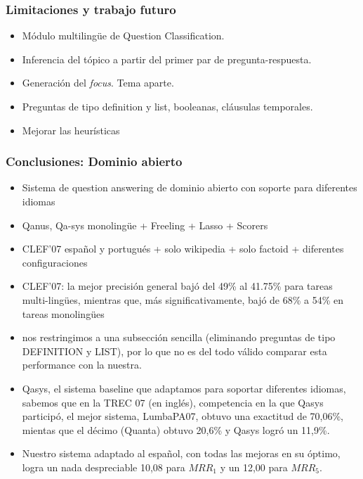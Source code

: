 \begin{frame}
\frametitle{Limitaciones y trabajo futuro}
\begin{itemize}
  \item Módulo multilingüe de Question Classification.
  \item Inferencia del tópico a partir del primer par de pregunta-respuesta.
  \item Generación del \textit{focus}. Tema aparte.
  \item Preguntas de tipo definition y list, booleanas, cláusulas temporales.
  \item Mejorar las heurísticas
\end{itemize}

\end{frame}


\begin{frame}
\frametitle{Conclusiones: Dominio abierto}
  \begin{itemize}
    \item Sistema de question answering de dominio abierto con soporte para diferentes idiomas
    \item Qanus, Qa-sys monolingüe + Freeling + Lasso + Scorers
    \item CLEF'07 español y portugués + solo wikipedia + solo factoid + diferentes configuraciones
    \item CLEF'07: la mejor precisión general bajó del 49\% al 41.75\% para tareas multi-lingües, mientras que, más significativamente, bajó de 68\% a 54\% en tareas monolingües
    \item nos restringimos a una subsección sencilla (eliminando preguntas de tipo DEFINITION y LIST), por lo que no es del todo válido comparar esta performance con la nuestra.
    \item Qasys, el sistema baseline que adaptamos para soportar diferentes idiomas, sabemos que en la TREC 07 (en inglés), competencia en la que Qasys participó, el mejor sistema, LumbaPA07, obtuvo una exactitud de 70,06\%, mientas que el décimo (Quanta) obtuvo 20,6\% y Qasys logró un 11,9\%.
\item Nuestro sistema adaptado al español, con todas las mejoras en su óptimo, logra un nada despreciable 10,08 para $MRR_1$ y un 12,00 para $MRR_5$.
  \end{itemize}

\end{frame}

